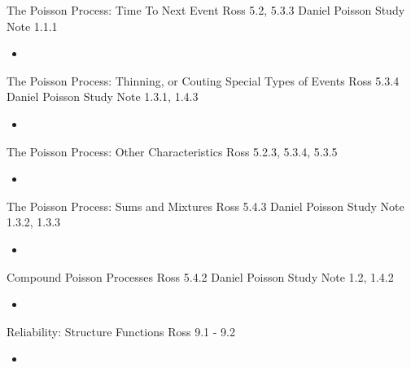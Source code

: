 \begin{CHPT_SUMM_AUTO_NUMB}[label = {L.-12}]{The Poisson Process: Time To Next Event}
Ross 5.2, 5.3.3
Daniel Poisson Study Note 1.1.1
	\begin{itemize}
		\item	
	\end{itemize}
\end{CHPT_SUMM_AUTO_NUMB}

\begin{CHPT_SUMM_AUTO_NUMB}[label = {L.-13}]{{The Poisson Process: Thinning, or Couting Special Types of Events}}
Ross 5.3.4
Daniel Poisson Study Note 1.3.1, 1.4.3
	\begin{itemize}
		\item	
	\end{itemize}
\end{CHPT_SUMM_AUTO_NUMB}

\begin{CHPT_SUMM_AUTO_NUMB}[label = {L.-14}]{The Poisson Process: Other Characteristics}
Ross 5.2.3, 5.3.4, 5.3.5
	\begin{itemize}
		\item	
	\end{itemize}
\end{CHPT_SUMM_AUTO_NUMB}

\begin{CHPT_SUMM_AUTO_NUMB}[label = {L.-15}]{The Poisson Process: Sums and Mixtures}
Ross 5.4.3
Daniel Poisson Study Note 1.3.2, 1.3.3
	\begin{itemize}
		\item	
	\end{itemize}
\end{CHPT_SUMM_AUTO_NUMB}

\begin{CHPT_SUMM_AUTO_NUMB}[label = {L.-16}]{Compound Poisson Processes}
Ross 5.4.2
Daniel Poisson Study Note 1.2, 1.4.2
	\begin{itemize}
		\item	
	\end{itemize}
\end{CHPT_SUMM_AUTO_NUMB}

\begin{CHPT_SUMM_AUTO_NUMB}[label = {L.-17}]{Reliability: Structure Functions}
Ross 9.1 - 9.2
	\begin{itemize}
		\item	
	\end{itemize}
\end{CHPT_SUMM_AUTO_NUMB}

